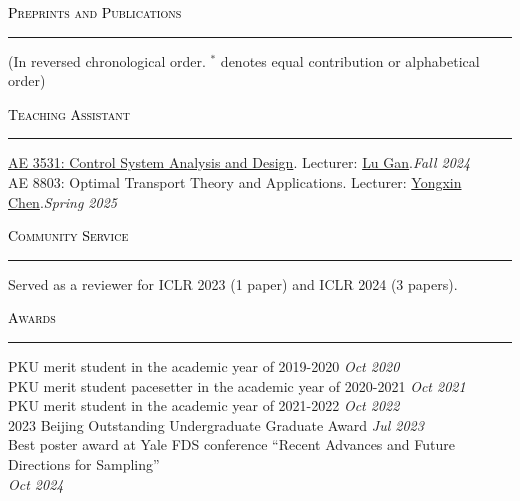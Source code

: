 \documentclass{resume} %
\renewenvironment{rSection}[1]{
\sectionskip
\textcolor{black}{\textsc{#1}}
\sectionlineskip
\hrule
\begin{list}{}{
\setlength{\leftmargin}{1.5em}
}
\item[]
}{
\end{list}
}
\begin{document}


\begin{rSection}{Preprints and Publications} 
    (In reversed chronological order. $^*$ denotes equal contribution or alphabetical order)
    \itemsep -2pt
    \nocite{*}\leavevmode\printbibliography[heading=none]
\end{rSection}



\begin{rSection}{Teaching Assistant} \itemsep -2pt
\href{https://ae3531a.notion.site/Course-Syllabus-Fall-2024-049faa69bedb4dd2b9b353318f52d5d6}{AE 3531: Control System Analysis and Design}. Lecturer: \href{https://research.gatech.edu/people/lu-gan}{Lu Gan}.\hfill {\em Fall 2024} \\
AE 8803: Optimal Transport Theory and Applications. Lecturer: \href{https://yongxin.ae.gatech.edu/}{Yongxin Chen}.\hfill {\em Spring 2025} \\
\end{rSection}


\begin{rSection}{Community Service} \itemsep -2pt
    Served as a reviewer for ICLR 2023 (1 paper) and ICLR 2024 (3 papers).
\end{rSection}


\newpage


\begin{rSection}{Awards} \itemsep -2pt
    PKU merit student in the academic year of 2019-2020 \hfill {\em Oct 2020} \\
    PKU merit student pacesetter in the academic year of 2020-2021 \hfill {\em Oct 2021} \\
    PKU merit student in the academic year of 2021-2022 \hfill {\em Oct 2022} \\
    2023 Beijing Outstanding Undergraduate Graduate Award \hfill {\em Jul 2023} \\
    Best poster award at Yale FDS conference ``Recent Advances and Future Directions for Sampling'' \\
    \phantom{.} \hfill {\em Oct 2024} \\
\end{rSection}
\end{document}
